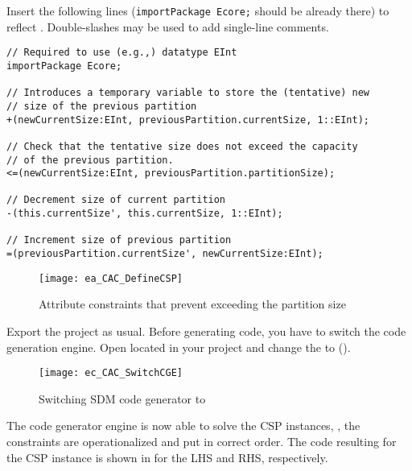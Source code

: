 \begin{stepbystep}
\item Insert the following lines (\texttt{importPackage Ecore;} should be already there) to reflect .
Double-slashes may be used to add single-line comments.
\begin{verbatim}
// Required to use (e.g.,) datatype EInt
importPackage Ecore;

// Introduces a temporary variable to store the (tentative) new
// size of the previous partition
+(newCurrentSize:EInt, previousPartition.currentSize, 1::EInt);

// Check that the tentative size does not exceed the capacity
// of the previous partition.
<=(newCurrentSize:EInt, previousPartition.partitionSize);

// Decrement size of current partition
-(this.currentSize', this.currentSize, 1::EInt);

// Increment size of previous partition
=(previousPartition.currentSize', newCurrentSize:EInt);
\end{verbatim}
%
\begin{figure}[htbp]
    \begin{center}
        \texttt{[image: ea\_CAC\_DefineCSP]}
        \caption{Attribute constraints that prevent exceeding the partition size}  
        \label{ea:ea_CAC_DefineCSP}
    \end{center}
\end{figure}
% 
\item
Export the project as usual. 
Before generating code, you have to switch the code generation engine.
Open  located in your project and change the  to   ().

\begin{figure}[htbp]
\begin{center}
  \texttt{[image: ec\_CAC\_SwitchCGE]}
  \caption{Switching SDM code generator to }  
  \label{ec_CAC_SwitchCGE}
\end{center}
\end{figure}

\end{stepbystep}
The code generator engine is now able to solve the CSP instances, \idest, the constraints are operationalized and put in correct order. 
The code resulting for the CSP instance is shown in  for the LHS and RHS, respectively.
